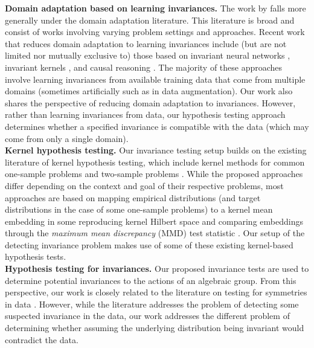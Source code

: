 \textbf{Domain adaptation based on learning invariances.} The work by \textcite{Mouli:2021} falls more generally under the domain adaptation literature. This literature is broad and consist of works involving varying problem settings and approaches. Recent work that reduces domain adaptation to learning invariances include (but are not limited nor mutually exclusive to) those based on invariant neural networks \parencite{Li:2018,Gu:2019,Zhao:2019,Schwobel:2021}, invariant kernels \parencite{Li:2018:kernel,Ma:2019,Elesedy:2021:equivariant,Elesedy:2021}, and causal reasoning \parencite{Magliacane:2017,Chen:2020:scm}. The majority of these approaches involve learning invariances from available training data that come from multiple domains (sometimes artificially such as in data augmentation). Our work also shares the perspective of reducing domain adaptation to invariances. However, rather than learning invariances from data, our hypothesis testing approach determines whether a specified invariance is compatible with the data (which may come from only a single domain).
\\

\textbf{Kernel hypothesis testing.} Our invariance testing setup builds on the existing literature of kernel hypothesis testing, which include kernel methods for common one-sample problems \parencite{Zhang:2011,Doran:2014,Kellner:2015,Chwialkowski:2016,Jitkrittum:2020} and two-sample problems \parencite{Gretton:2007,Gretton:2012}. While the proposed approaches differ depending on the context and goal of their respective problems, most approaches are based on mapping empirical  distributions (and target distributions in the case of some one-sample problems) to a kernel mean embedding in some reproducing kernel Hilbert space and comparing embeddings through the \textit{maximum mean discrepancy} (MMD) test statistic \parencite{Harchaoui:2013}.
Our setup of the detecting invariance problem makes use of some of these existing kernel-based hypothesis tests.
\\

\textbf{Hypothesis testing for invariances.}
Our proposed invariance tests are used to determine potential invariances to the actions of an algebraic group. From this perspective, our work is closely related to the literature on testing for symmetries in data \parencite{Henze:2003,NgatchouWandji:2009,Partlett:2015}. However, while the literature addresses the problem of detecting some suspected invariance in the data, our work addresses the different problem of determining whether assuming the underlying distribution being invariant would contradict the data.

